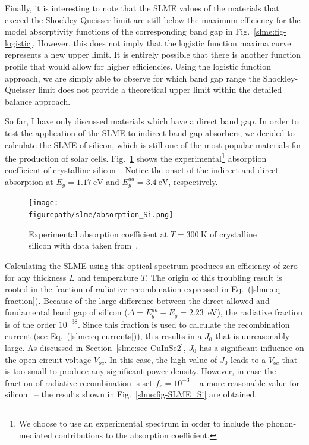 \begin{refsection}
Finally, it is interesting to note that the SLME values of the materials that 
exceed the Shockley-Queisser limit are still below the maximum efficiency for 
the model absorptivity functions of the corresponding band gap in 
Fig.~\ref{slme:fig-logistic}. However, this does not imply that the logistic 
function maxima curve represents a new upper limit. It is entirely possible 
that there is another function profile that would allow for higher 
efficiencies. Using the logistic function approach, we are simply able to 
observe for which band gap range the Shockley-Queisser limit does not provide 
a theoretical upper limit within the detailed balance approach. 
 
 
So far, I have only discussed materials which have a direct band gap. In 
order to test the application of the SLME to indirect band gap absorbers, we 
decided to calculate the SLME of silicon, which is still one of the most 
popular materials for the production of solar cells. 
Fig.~\ref{slme:fig-Si_expAbs} shows the experimental\footnote{We choose to 
use an experimental spectrum in order to include the phonon-mediated 
contributions to the absorption coefficient.} absorption coefficient of 
crystalline silicon~\cite{green2008}. Notice the onset of the indirect and 
direct absorption at \mbox{$E_g = 1.17~\si{\electronvolt}$} and 
\mbox{$E_g^{da} = 3.4~\si{\electronvolt}$}, respectively. 

\begin{figure}[ht] 
\centering 
\captionsetup{width=0.9\textwidth}
\texttt{[image: \\figurepath/slme/absorption\_Si.png]} 
\caption{Experimental absorption coefficient at $T = 300~\si{\kelvin}$ of 
crystalline silicon with data taken from~\cite{green2008}.} 
\label{slme:fig-Si_expAbs} 
\end{figure} 

Calculating the SLME using this optical spectrum produces an efficiency of 
zero for any thickness $L$ and temperature $T$. The origin of this troubling result is 
rooted in the fraction of radiative recombination expressed in 
Eq.~(\ref{slme:eq-fraction}). Because of the large difference between the 
direct allowed and fundamental band gap of silicon ($\Delta = 
E_g^{da}-E_g=2.23$~\si{\electronvolt}), the radiative fraction is of the order 
$10^{-38}$. Since this fraction is used to calculate the recombination 
current (see Eq.~(\ref{slme:eq-currents})), this results in a $J_0$ that is 
unreasonably large. As discussed in Section~\ref{slme:sec-CuInSe2}, $J_0$ has a 
significant influence on the open circuit voltage $V_{oc}$. In this case, the 
high value of $J_0$ leads to a $V_{oc}$ that is too small to produce any 
significant power density. However, in case the fraction of radiative recombination is set \mbox{$f_r = 10^{-3}$} -- a 
more reasonable value for silicon~\cite{Shockley1952,Trupke2003,Richter2012} -- the results shown in Fig.~\ref{slme:fig-SLME_Si} are obtained. 
 

\end{refsection}
